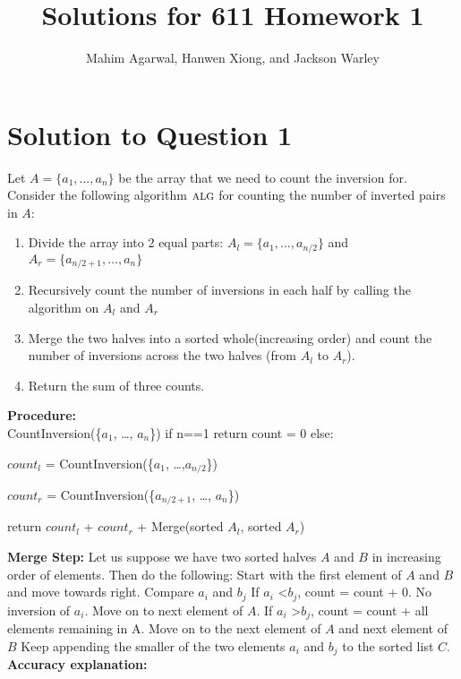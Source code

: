 \documentclass[11pt]{article}
\title{Solutions for 611 Homework 1}
\author{Mahim Agarwal, Hanwen Xiong, and Jackson Warley}
\newcommand{\alg}{\textsc{alg}}
\begin{document}
\maketitle

\section{Solution to Question 1}
Let $A = \{a_1, \dots, a_n\}$ be the array that we need to count the inversion for.
Consider the following algorithm $\alg$ for counting the number of inverted pairs in $A$:
\begin{enumerate}
  \item Divide the array into 2 equal parts: $A_l = \{a_1, \dots, a_{n/2}\}$ and $A_r = \{a_{n/2+1}, \dots, a_n\}$
  \item Recursively count the number of inversions in each half by calling the algorithm on $A_l$ and $A_r$
  \item Merge the two halves into a sorted whole(increasing order) and count the number of inversions across
the two halves (from $A_l$ to $A_r$).
\item Return the sum of three counts.
 \end{enumerate}
{\bf Procedure:}\\
CountInversion(\{$a_1$, \dots, $a_n$\}) \newline
if n==1 return count = 0 \newline
\newline
else:

 $count_l$ = CountInversion(\{$a_1$, \dots,$a_{n/2}$\})

 $count_r$ = CountInversion(\{$a_{n/2+1}$, \dots, $a_n$\})

return  $count_l$ + $count_r$ + Merge(sorted $A_l$, sorted $A_r$)

{\bf Merge Step:} \newline
Let us suppose we have two sorted halves $A$ and $B$ in increasing order of elements. Then do the following: \newline
Start with the first element of $A$ and $B$ and move towards right. \newline
Compare $a_i$ and $b_j$ \newline
If $a_i$ \textless  $b_j$, count = count + 0. No inversion of $a_i$. Move on to next element of $A$. \newline
If $a_i$ \textgreater $b_j$, count = count + all elements remaining in A. Move on to the next element of $A$ and next  element of $B$ \newline
Keep appending the smaller of the two elements $a_i$ and $b_j$ to the sorted list $C$. \newline
{\bf Accuracy explanation:}\newline
\end{document}
